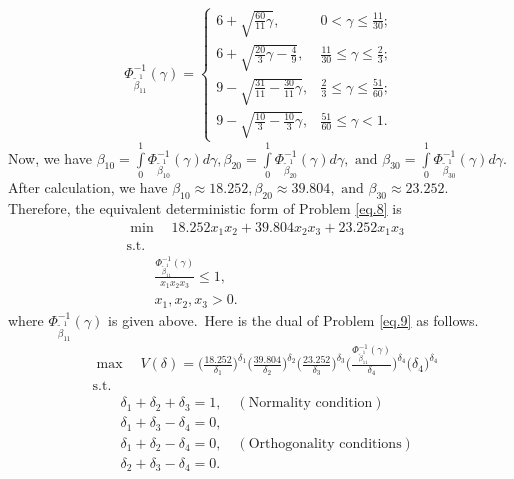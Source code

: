 \[\Phi_{\tilde{\beta}_{11}^1}^{-1}(\gamma)=\left\{
\begin{array}{ll}
	6+\sqrt{\frac{60}{11}\gamma}, & 0<\gamma\leq \frac{11}{30};\\
	6+\sqrt{\frac{20}{3}\gamma-\frac{4}{9}}, & \frac{11}{30}\leq\gamma\leq \frac{2}{3};\\
	9-\sqrt{\frac{31}{11}-\frac{30}{11}\gamma}, & \frac{2}{3}\leq\gamma\leq \frac{51}{60};\\
	9-\sqrt{\frac{10}{3}-\frac{10}{3}\gamma}, & \frac{51}{60}\leq\gamma<1.
\end{array}
\right.
\]  
Now, we have $\beta_{10}=\int\limits_{0}^{1}\Phi_{\tilde{\beta}_{10}^1}^{-1}(\gamma)d\gamma,\beta_{20}=\int\limits_{0}^{1}\Phi_{\tilde{\beta}_{20}^1}^{-1}(\gamma)d\gamma,\text{ and }\beta_{30}=\int\limits_{0}^{1}\Phi_{\tilde{\beta}_{30}^1}^{-1}(\gamma)d\gamma.$ After calculation, we have $\beta_{10}\approx 18.252,\beta_{20}\approx 39.804,\text{ and }\beta_{30}\approx 23.252.$ Therefore, the equivalent deterministic form of Problem \ref{eq.8} is
\begin{equation}\label{eq.9}
	\begin{aligned}
		&	\min \quad 18.252x_1 x_2+39.804x_2 x_3+
		23.252x_1 x_3\\
		&	\text{s.t.} \\
		&\qquad  \frac{\Phi_{\tilde{\beta}_{11}^1}^{-1}(\gamma)}{x_1 x_2x_3}\leq 1,\\
		&\qquad	x_1,x_2,x_3>0.
	\end{aligned}
\end{equation}
where $\Phi_{\tilde{\beta}_{11}^1}^{-1}(\gamma)$ is given above. Here is the dual of Problem \ref{eq.9} as follows.
\begin{equation}\label{eq.10}
	\begin{aligned}
		&\max \quad V(\delta)=\bigg(\frac{18.252}{{\delta_{1}}}\bigg)^{{\delta_{1}}}\bigg(\frac{39.804}{{\delta_{2}}}\bigg)^{{\delta_{2}}} \bigg(\frac{23.252}{{\delta_{3}}}\bigg)^{{\delta_{3}}}\bigg(\frac{\Phi_{\tilde{\beta}_{11}^1}^{-1}(\gamma)}{{\delta_{4}}}\bigg)^{{\delta_{4}}}\big(\delta_4\big)^{\delta_4}\\
		&\text{s.t.}\\
		& \qquad \delta_1+\delta_{2}+\delta_{3}=1, \quad (\text{Normality condition})\\
		&\qquad \delta_{1}+\delta_{3}-\delta_{4}=0,\\
		&\qquad \delta_{1}+\delta_{2}-\delta_{4}=0, \quad (\text{Orthogonality conditions})\\
		&\qquad \delta_{2}+\delta_{3}-\delta_{4}=0.
	\end{aligned}
\end{equation}
